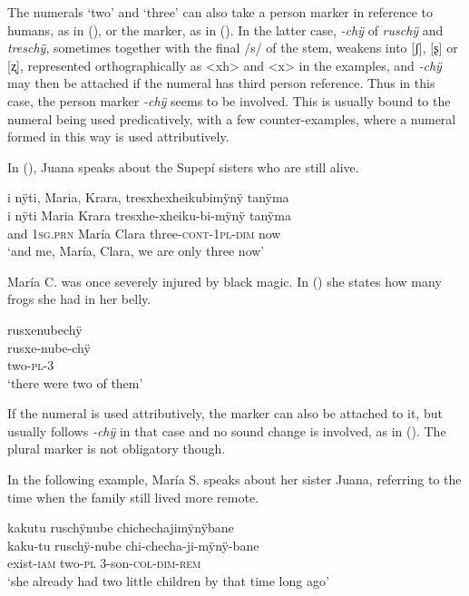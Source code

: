The numerals ‘two’ and ‘three’ can also take a person marker in reference to humans, as in (), or the  marker, as in (). In the latter case, \textit{-chÿ} of \textit{ruschÿ} and \textit{treschÿ}, sometimes together with the final /s/ of the stem, weakens into [ʃ], [​ʂ​] or [​ʐ​], represented orthographically as <xh> and <x> in the examples, and \textit{-chÿ} may then be attached if the numeral has third person reference. Thus in this case, the person marker \textit{-chÿ} seems to be involved. This is usually bound to the numeral being used predicatively, with a few counter-examples, where a numeral formed in this way is used attributively.

In (), Juana speaks about the Supepí sisters who are still alive.

\ea\label{ex:three-2}
\begingl
\glpreamble i nÿti, Maria, Krara, tresxhexheikubimÿnÿ tanÿma\\
\gla i nÿti Maria Krara tresxhe-xheiku-bi-mÿnÿ tanÿma\\
\glb and 1\textsc{sg.prn} María Clara three-\textsc{cont}-1\textsc{pl}-\textsc{dim} now\\
\glft ‘and me, María, Clara, we are only three now’
\endgl
\trailingcitation{[jxx-p120430l-2.352-353]}
\xe

María C. was once severely injured by black magic. In () she states how many frogs she had in her belly.

\ea\label{ex:two-predi}
\begingl
\glpreamble rusxenubechÿ \\
\gla rusxe-nube-chÿ\\
\glb two-\textsc{pl}-3\\
\glft ‘there were two of them’
\endgl
\trailingcitation{[ump-p110815sf.312]}
\xe

If the numeral is used attributively, the  marker can also be attached to it, but usually follows \textit{-chÿ} in that case and no sound change is involved, as in (). The plural marker is not obligatory though.

In the following example, María S. speaks about her sister Juana, referring to the time when the family still lived more remote.

\ea\label{ex:two-5}
\begingl
\glpreamble kakutu ruschÿnube chichechajimÿnÿbane\\
\gla kaku-tu ruschÿ-nube chi-checha-ji-mÿnÿ-bane\\
\glb exist-\textsc{iam} two-\textsc{pl} 3-son-\textsc{col}-\textsc{dim}-\textsc{rem}\\
\glft ‘she already had two little children by that time long ago’
\endgl
\trailingcitation{[rxx-p181101l-2.107]}
\xe

